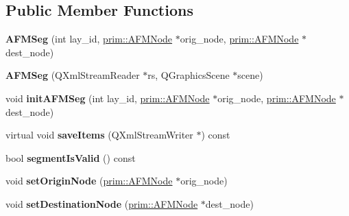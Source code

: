 \subsection*{Public Member Functions}
\begin{DoxyCompactItemize}
\item 
{\bfseries A\+F\+M\+Seg} (int lay\+\_\+id, \hyperlink{classprim_1_1AFMNode}{prim\+::\+A\+F\+M\+Node} $\ast$orig\+\_\+node, \hyperlink{classprim_1_1AFMNode}{prim\+::\+A\+F\+M\+Node} $\ast$dest\+\_\+node)\hypertarget{classprim_1_1AFMSeg_ab42966fdda3d9cd8ff2f28cd7ff9154b}{}\label{classprim_1_1AFMSeg_ab42966fdda3d9cd8ff2f28cd7ff9154b}

\item 
{\bfseries A\+F\+M\+Seg} (Q\+Xml\+Stream\+Reader $\ast$rs, Q\+Graphics\+Scene $\ast$scene)\hypertarget{classprim_1_1AFMSeg_ab5d4f69d84cec00031a65234638f5b67}{}\label{classprim_1_1AFMSeg_ab5d4f69d84cec00031a65234638f5b67}

\item 
void {\bfseries init\+A\+F\+M\+Seg} (int lay\+\_\+id, \hyperlink{classprim_1_1AFMNode}{prim\+::\+A\+F\+M\+Node} $\ast$orig\+\_\+node, \hyperlink{classprim_1_1AFMNode}{prim\+::\+A\+F\+M\+Node} $\ast$dest\+\_\+node)\hypertarget{classprim_1_1AFMSeg_a6e149a3012c16dd8f55b3ce38d9ef46f}{}\label{classprim_1_1AFMSeg_a6e149a3012c16dd8f55b3ce38d9ef46f}

\item 
virtual void {\bfseries save\+Items} (Q\+Xml\+Stream\+Writer $\ast$) const \hypertarget{classprim_1_1AFMSeg_aacea8eed7aa86517225d6d19a9fcf4a8}{}\label{classprim_1_1AFMSeg_aacea8eed7aa86517225d6d19a9fcf4a8}

\item 
bool {\bfseries segment\+Is\+Valid} () const \hypertarget{classprim_1_1AFMSeg_afcb5e7fb168857e1b0e7bb9c6beb5648}{}\label{classprim_1_1AFMSeg_afcb5e7fb168857e1b0e7bb9c6beb5648}

\item 
void {\bfseries set\+Origin\+Node} (\hyperlink{classprim_1_1AFMNode}{prim\+::\+A\+F\+M\+Node} $\ast$orig\+\_\+node)\hypertarget{classprim_1_1AFMSeg_a13ee0fff23d20063891ba5477874f2e9}{}\label{classprim_1_1AFMSeg_a13ee0fff23d20063891ba5477874f2e9}

\item 
void {\bfseries set\+Destination\+Node} (\hyperlink{classprim_1_1AFMNode}{prim\+::\+A\+F\+M\+Node} $\ast$dest\+\_\+node)\hypertarget{classprim_1_1AFMSeg_a093f151cd938a86f8844659932d90215}{}\label{classprim_1_1AFMSeg_a093f151cd938a86f8844659932d90215}


\end{DoxyCompactItemize}

